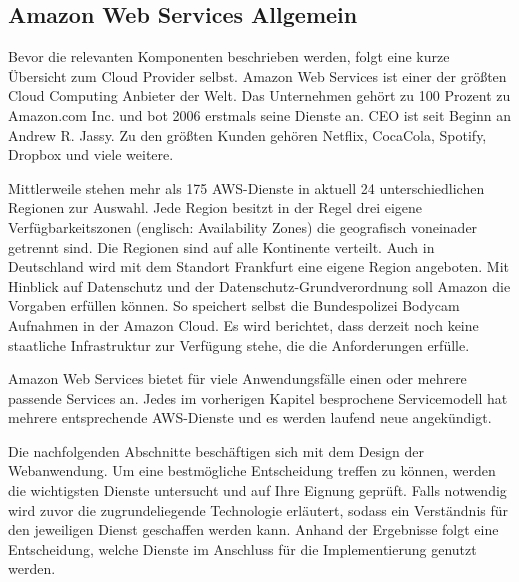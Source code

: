 \subsection{Amazon Web Services Allgemein}

Bevor die relevanten Komponenten beschrieben werden, folgt eine kurze Übersicht zum Cloud Provider selbst.
Amazon Web Services ist einer der größten Cloud Computing Anbieter der Welt. Das Unternehmen gehört zu 100 Prozent zu Amazon.com Inc. und bot 2006 erstmals seine Dienste an. CEO ist seit Beginn an Andrew R. Jassy.
Zu den größten Kunden gehören Netflix, CocaCola, Spotify, Dropbox und viele weitere. \cite{AWSAllgemein}

Mittlerweile stehen mehr als 175 AWS-Dienste in aktuell 24 unterschiedlichen Regionen zur Auswahl.
Jede Region besitzt in der Regel drei eigene Verfügbarkeitszonen (englisch: Availability Zones) die geografisch voneinader getrennt sind.
Die Regionen sind auf alle Kontinente verteilt.
Auch in Deutschland wird mit dem Standort Frankfurt eine eigene Region angeboten.
Mit Hinblick auf Datenschutz und der Datenschutz-Grundverordnung soll Amazon die Vorgaben erfüllen können.
So speichert selbst die Bundespolizei Bodycam Aufnahmen in der Amazon Cloud.\cite{AWSPolizei}
Es wird berichtet, {}\glqq dass derzeit noch keine staatliche Infrastruktur zur Verfügung stehe, die die Anforderungen erfülle.\grqq{}
\cite[Abschnitt 1]{AWSPolizei}

Amazon Web Services bietet für viele Anwendungsfälle einen oder mehrere passende Services an.
Jedes im vorherigen Kapitel besprochene Servicemodell hat mehrere entsprechende AWS-Dienste und es werden laufend neue angekündigt.


Die nachfolgenden Abschnitte beschäftigen sich mit dem Design der Webanwendung.
Um eine bestmögliche Entscheidung treffen zu können, werden die wichtigsten Dienste untersucht und auf Ihre Eignung geprüft.
Falls notwendig wird zuvor die zugrundeliegende Technologie erläutert, sodass ein Verständnis für den jeweiligen Dienst geschaffen werden kann.
Anhand der Ergebnisse folgt eine Entscheidung, welche Dienste im Anschluss für die Implementierung genutzt werden.




